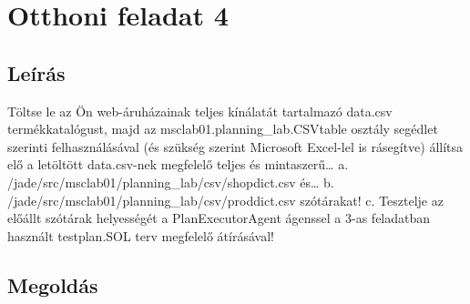 \section{Otthoni feladat 4}
\subsection{Leírás}
Töltse le az Ön web-áruházainak teljes kínálatát tartalmazó data.csv termékkatalógust, majd az msclab01.planning\_lab.CSVtable osztály segédlet szerinti felhasználásával (és szükség szerint Microsoft Excel-lel is rásegítve) állítsa elő a letöltött data.csv-nek megfelelő teljes és mintaszerű… a. /jade/src/msclab01/planning\_lab/csv/shopdict.csv és… b. /jade/src/msclab01/planning\_lab/csv/proddict.csv szótárakat! c. Tesztelje az előállt szótárak helyességét a PlanExecutorAgent ágenssel a  3-as feladatban használt testplan.SOL terv megfelelő átírásával! 
\subsection{Megoldás}

